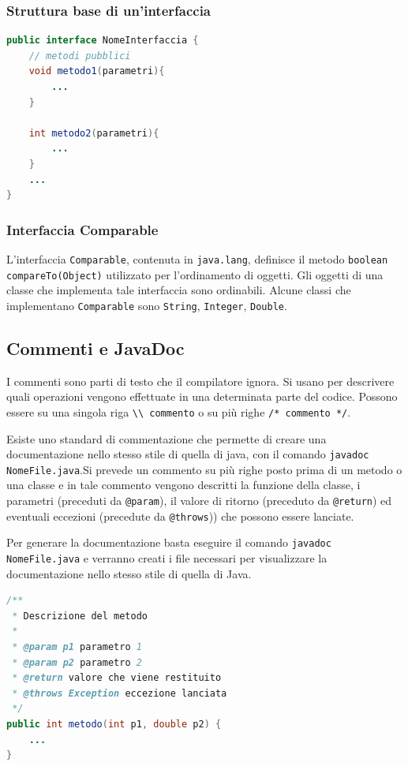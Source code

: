 \documentclass[a4paper]{article}
\begin{document}
\subsubsection*{Struttura base di un'interfaccia}
\begin{lstlisting}[language=Java]
public interface NomeInterfaccia {
	// metodi pubblici
	void metodo1(parametri){
		...
	}

	int metodo2(parametri){
		...
	}
	...
}
\end{lstlisting}

\subsubsection*{Interfaccia Comparable}
L'interfaccia \verb|Comparable|, contenuta in \verb|java.lang|, definisce il metodo \verb|boolean compareTo(Object)|
utilizzato per l'ordinamento di oggetti. Gli oggetti di una classe che implementa tale interfaccia sono ordinabili.
Alcune classi che implementano \verb|Comparable| sono \verb|String|, \verb|Integer|, \verb|Double|.

\subsection{Commenti e JavaDoc}
I commenti sono parti di testo che il compilatore ignora. Si usano per descrivere quali operazioni vengono effettuate
in una determinata parte del codice. Possono essere su una singola riga \verb|\\ commento| o su più righe \verb|/* commento */|.

Esiste uno standard di commentazione che permette di creare una documentazione nello stesso stile di quella di java,
con il  comando \verb|javadoc NomeFile.java|.Si prevede un commento su più righe posto prima di un metodo o una classe
e in tale commento vengono descritti la funzione della classe, i parametri (preceduti da \verb|@param|), il valore di
ritorno (preceduto da \verb|@return|) ed eventuali eccezioni (precedute da \verb|@throws|)) che possono essere lanciate.

Per generare la documentazione basta eseguire il comando \verb|javadoc NomeFile.java| e verranno creati i file necessari
per visualizzare la documentazione nello stesso stile di quella di Java.

\begin{lstlisting}[language=Java]
/**
 * Descrizione del metodo
 * 
 * @param p1 parametro 1
 * @param p2 parametro 2
 * @return valore che viene restituito
 * @throws Exception eccezione lanciata
 */
public int metodo(int p1, double p2) {
	...
}
\end{lstlisting}
\end{document}
